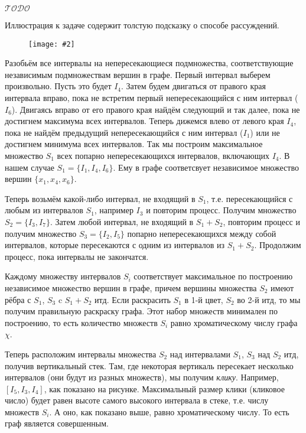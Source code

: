 \documentclass[a4paper,12pt]{article}
\numberwithin{figure}{section}
\def\TODO{\guillemotleft$\mathcal{TODO}$\guillemotright\textellipsis}
\newcommand\CenterFigure[2]{\begin{figure}[H]\centering\texttt{[image: \#2]}\end{figure}}
\begin{document}
\begin{solution}

	\TODO

	Иллюстрация к задаче содержит толстую подсказку о способе рассуждений.
		\CenterFigure{8cm}{interval-graph-coloring--solution.png}
	Разобьём все интервалы на непересекающиеся подмножества, соответствующие независимым подмножествам вершин в графе. Первый интервал выберем произвольно. Пусть это будет $I_4$. Затем будем двигаться от правого края интервала вправо, пока не встретим первый непересекающийся с ним интервал ($I_6$). Двигаясь вправо от его правого края найдём следующий и так далее, пока не достигнем максимума всех интервалов. Теперь дижемся влево от левого края $I_4$, пока не найдём предыдущий непересекающийся с ним интервал ($I_1$) или не достигнем минимума всех интервалов. Так мы построим максимальное множество $S_1$ всех попарно непересекающихся интервалов, включающих $I_4$. В нашем случае $S_1=\{I_1,I_4,I_6\}$. Ему в графе соответсвует независимое множество вершин $\{x_1,x_4,x_6\}$.
	
	Теперь возьмём какой-либо интервал, не входящий в $S_1$, т.е. пересекающийся с любым из интервалов $S_1$, например $I_3$ и повторим процесс. Получим множество $S_2=\{I_3,I_7\}$. Затем любой интервал, не входящий в $S_1+S_2$, повторим процесс и получим множество $S_3=\{I_2,I_5\}$ попарно непересекающихся между собой интервалов, которые пересекаются с одним из интервалов из $S_1+S_2$. Продолжим процесс, пока интервалы не закончатся.
	
	Каждому множеству интервалов $S_i$ соответствует максимальное по построению независимое множество вершин в графе, причем вершины множества $S_2$ имеют рёбра с $S_1$, $S_3$ c $S_1+S_2$ итд. Если раскрасить $S_1$ в 1-й цвет, $S_2$ во 2-й итд, то мы получим правильную раскраску графа. Этот набор множеств минимален по построению, то есть количество множеств $S_i$ равно хроматическому числу графа $\chi$.
	
	Теперь расположим интервалы множества $S_2$ над интервалами $S_1$, $S_3$ над $S_2$ итд, получив вертикальный стек. Там, где некоторая вертикаль пересекает несколько интервалов (они будут из разных множеств), мы получим \textit{клику}. Например, $[I_5,I_3,I_4]$, как показано на рисунке. Максимальный размер клики (кликовое число) будет равен высоте самого высокого интервала в стеке, т.е. числу множеств $S_i$. А оно, как показано выше, равно хроматическому числу. То есть граф является совершенным.
\end{solution}
\end{document}
